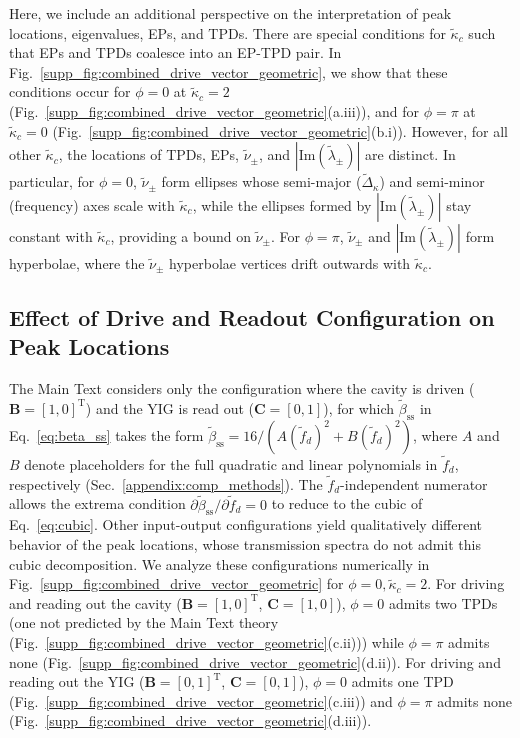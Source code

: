 \documentclass[%
  reprint,
  amsmath,amssymb,
  aps,
  prapplied,
  superscriptaddress,
  longbibliography]{revtex4-2}
\begin{document}
Here, we include an additional perspective on the interpretation of peak locations, eigenvalues, EPs, and TPDs. There are special conditions for $\tilde{\kappa}_c$ such that EPs and TPDs coalesce into an EP-TPD pair. In Fig.~\ref{supp_fig:combined_drive_vector_geometric}, we show that these conditions occur for $\phi = 0$ at $\tilde{\kappa}_c = 2$ (Fig.~\ref{supp_fig:combined_drive_vector_geometric}(a.iii)), and for $\phi = \pi$ at $\tilde{\kappa}_c = 0$ (Fig.~\ref{supp_fig:combined_drive_vector_geometric}(b.i)). However, for all other $\tilde{\kappa}_c$, the locations of TPDs, EPs, $\tilde{\nu}_\pm$, and $|\text{Im}(\tilde{\lambda}_\pm)|$ are distinct. In particular, for $\phi = 0$, $\tilde{\nu}_\pm$ form ellipses whose semi-major ($\tilde{\Delta}_\kappa$) and semi-minor (frequency) axes scale with $\tilde{\kappa}_c$, while the ellipses formed by $|\text{Im}(\tilde{\lambda}_\pm)|$ stay constant with $\tilde{\kappa}_c$, providing a bound on $\tilde{\nu}_\pm$. For $\phi = \pi$, $\tilde{\nu}_\pm$ and $|\text{Im}(\tilde{\lambda}_\pm)|$ form hyperbolae, where the $\tilde{\nu}_\pm$ hyperbolae vertices drift outwards with $\tilde{\kappa}_c$. 

\subsection{\label{appendix-sec:drive_readout_vector}Effect of Drive and Readout Configuration on Peak Locations}

The Main Text considers only the configuration where the cavity is driven ($\bm{B} = [1,0]^{\mathrm T}$) and the YIG is read out ($\bm{C} = [0, 1]$), for which $\tilde{\beta}_{\mathrm{ss}}$ in Eq.~\ref{eq:beta_ss} takes the form $\tilde{\beta}_\mathrm{ss}=16/(A(\tilde{f}_d)^2 + B(\tilde{f}_d)^2)$, where $A$ and $B$ denote placeholders for the full quadratic and linear polynomials in $\tilde{f}_d$, respectively (Sec.~\ref{appendix:comp_methods}). The $\tilde{f}_d$-independent numerator allows the extrema condition $\partial \tilde{\beta}_{\mathrm{ss}}/\partial \tilde{f}_d = 0$ to reduce to the cubic of Eq.~\ref{eq:cubic}. Other input-output configurations yield qualitatively different behavior of the peak locations, whose transmission spectra do not admit this cubic decomposition. We analyze these configurations numerically in Fig.~\ref{supp_fig:combined_drive_vector_geometric} for $\phi = 0, \tilde{\kappa}_c =2$. For driving and reading out the cavity ($\bm{B} = [1,0]^{\mathrm T}$, $\bm{C} = [1, 0]$), $\phi = 0$ admits two TPDs (one not predicted by the Main Text theory (Fig.~\ref{supp_fig:combined_drive_vector_geometric}(c.ii))) while $\phi = \pi$ admits none (Fig.~\ref{supp_fig:combined_drive_vector_geometric}(d.ii)). For driving and reading out the YIG ($\bm{B} = [0, 1]^{\mathrm T}$, $\bm{C} = [0, 1]$), $\phi = 0$ admits one TPD (Fig.~\ref{supp_fig:combined_drive_vector_geometric}(c.iii)) and $\phi = \pi$ admits none (Fig.~\ref{supp_fig:combined_drive_vector_geometric}(d.iii)).
\end{document}
